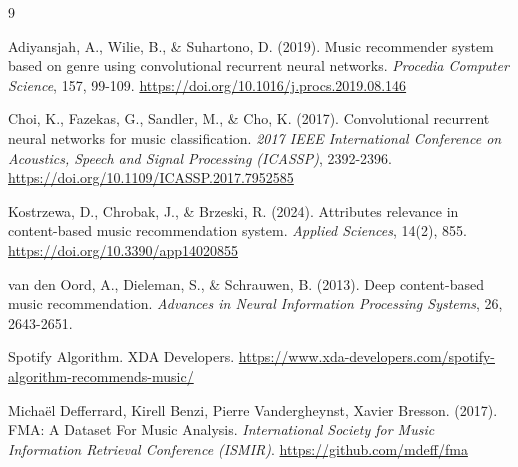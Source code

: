 \begin{thebibliography}{9}

	Adiyansjah, A., Wilie, B., \& Suhartono, D. (2019). Music recommender system based on genre using convolutional recurrent neural networks. \textit{Procedia Computer Science}, 157, 99-109. \url{https://doi.org/10.1016/j.procs.2019.08.146}

	Choi, K., Fazekas, G., Sandler, M., \& Cho, K. (2017). Convolutional recurrent neural networks for music classification. \textit{2017 IEEE International Conference on Acoustics, Speech and Signal Processing (ICASSP)}, 2392-2396. \url{https://doi.org/10.1109/ICASSP.2017.7952585}

	Kostrzewa, D., Chrobak, J., \& Brzeski, R. (2024). Attributes relevance in content-based music recommendation system. \textit{Applied Sciences}, 14(2), 855. \url{https://doi.org/10.3390/app14020855}

	van den Oord, A., Dieleman, S., \& Schrauwen, B. (2013). Deep content-based music recommendation. \textit{Advances in Neural Information Processing Systems}, 26, 2643-2651.

	Spotify Algorithm. XDA Developers. \url{https://www.xda-developers.com/spotify-algorithm-recommends-music/}

	Michaël Defferrard, Kirell Benzi, Pierre Vandergheynst, Xavier Bresson. (2017). FMA: A Dataset For Music Analysis. \textit{International Society for Music Information Retrieval Conference (ISMIR)}. \url{https://github.com/mdeff/fma}

\end{thebibliography}

